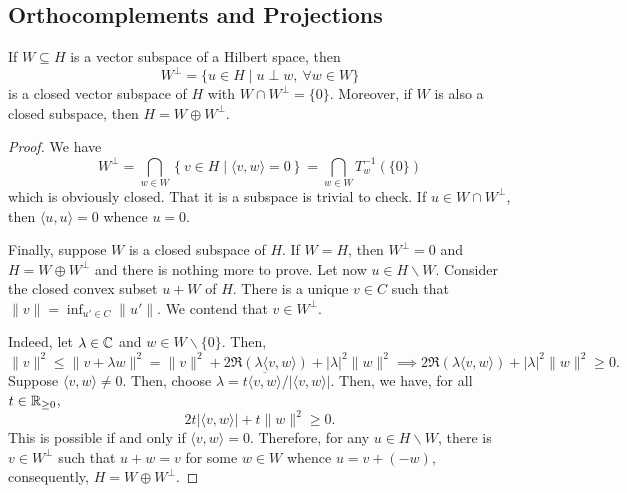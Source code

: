 \subsection{Orthocomplements and Projections}

\begin{proposition}
    If $W\subseteq H$ is a vector subspace of a Hilbert space, then 
    \begin{equation*}
        W^\perp = \{u\in H\mid u\perp w,~\forall w\in W\}
    \end{equation*}
    is a closed vector subspace of $H$ with $W\cap W^\perp = \{0\}$. Moreover, if $W$ is also a closed subspace, then $H = W\oplus W^\perp$.
\end{proposition}
\begin{proof}
    We have 
    \begin{equation*}
        W^\perp = \bigcap_{w\in W}\left\{v\in H\mid\langle v, w\rangle = 0\right\} = \bigcap_{w\in W}T_w^{-1}(\{0\})
    \end{equation*}
    which is obviously closed. That it is a subspace is trivial to check. If $u\in W\cap W^\perp$, then $\langle u,u\rangle = 0$ whence $u = 0$.

    Finally, suppose $W$ is a closed subspace of $H$. If $W = H$, then $W^\perp = 0$ and $H = W\oplus W^\perp$ and there is nothing more to prove. Let now $u\in H\backslash W$. Consider the closed convex subset $u + W$ of $H$. There is a unique $v\in C$ such that $\|v\| = \inf_{u'\in C}\|u'\|$. We contend that $v\in W^\perp$.

    Indeed, let $\lambda\in\mathbb{C}$ and $w\in W\backslash\{0\}$. Then, 
    \begin{equation*}
        \|v\|^2\le\|v + \lambda w\|^2 = \|v\|^2 + 2\Re(\lambda\langle v,w\rangle) + |\lambda|^2\|w\|^2 \implies 2\Re(\lambda\langle v,w\rangle) + |\lambda|^2\|w\|^2\ge 0.
    \end{equation*}
    Suppose $\langle v,w\rangle \ne 0$. Then, choose $\lambda = t\overline{\langle v,w\rangle}/|\langle v,w\rangle|$. Then, we have, for all $t\in\mathbb{R}_{\ge 0}$, 
    \begin{equation*}
        2t|\langle v,w\rangle| + t\|w\|^2\ge 0.
    \end{equation*}
    This is possible if and only if $\langle v,w\rangle = 0$. Therefore, for any $u\in H\backslash W$, there is $v\in W^\perp$ such that $u + w = v$ for some $w\in W$ whence $u = v + (-w)$, consequently, $H = W\oplus W^\perp$.
\end{proof}

